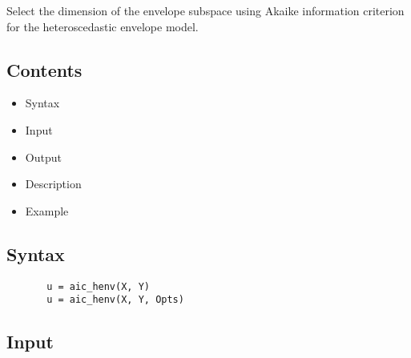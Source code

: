\documentclass[a4paper,11pt,openany]{memoir}
\begin{document}
\begin{par}
Select the dimension of the envelope subspace using Akaike information criterion for the heteroscedastic envelope model.
\end{par} \vspace{1em}

\subsection*{Contents}

\begin{itemize}
\setlength{\itemsep}{-1ex}
   \item Syntax
   \item Input
   \item Output
   \item Description
   \item Example
\end{itemize}


\subsection*{Syntax}


\begin{verbatim}       u = aic_henv(X, Y)
       u = aic_henv(X, Y, Opts)\end{verbatim}
    

\subsection*{Input}
\end{document}

